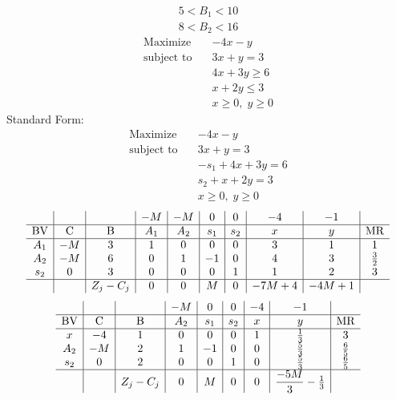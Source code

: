 \documentclass{article}
\begin{document}
\begin{align*}
5<B_{1}<10\end{align*}
\begin{align*}
8<B_{2}<16\end{align*}
\begin{align*}
\text{Maximize} \quad & -4x - y\\
\text{subject to} \quad
& 3x + y=3\\
& 4x + 3y\ge6\\
& x + 2y\le3\\
& x\ge0,\; y\ge0\end{align*}
Standard Form:\\
\begin{align*}
\text{Maximize} \quad & -4x - y\\
\text{subject to} \quad
& 3x + y=3\\
& -s_{1} + 4x + 3y=6\\
& s_{2} + x + 2y=3\\
& x\ge0,\; y\ge0\end{align*}
\begin{align*}
\begin{array}{c|c|c|c|c|c|c|c|c|c}
 &  &  & -M & -M & 0 & 0 & -4 & -1 & \\
\hline
\text{BV} & \text{C} & \text{B} & A_{1} & A_{2} & s_{1} & s_{2} & x & y & \text{MR} \\
\hline
A_{1} & -M & 3 & 1 & 0 & 0 & 0 & 3 & 1 & 1 \\
A_{2} & -M & 6 & 0 & 1 & -1 & 0 & 4 & 3 & \frac{3}{2} \\
s_{2} & 0 & 3 & 0 & 0 & 0 & 1 & 1 & 2 & 3 \\
\hline
 &  & Z_j-C_j & 0 & 0 & M & 0 & -7M + 4 & -4M + 1 & \\
\end{array}
\end{align*}
\begin{align*}
\begin{array}{c|c|c|c|c|c|c|c|c}
 &  &  & -M & 0 & 0 & -4 & -1 & \\
\hline
\text{BV} & \text{C} & \text{B} & A_{2} & s_{1} & s_{2} & x & y & \text{MR} \\
\hline
x & -4 & 1 & 0 & 0 & 0 & 1 & \frac{1}{3} & 3 \\
A_{2} & -M & 2 & 1 & -1 & 0 & 0 & \frac{5}{3} & \frac{6}{5} \\
s_{2} & 0 & 2 & 0 & 0 & 1 & 0 & \frac{5}{3} & \frac{6}{5} \\
\hline
 &  & Z_j-C_j & 0 & M & 0 & 0 & \dfrac{-5M}{3} - \frac{1}{3} & \\
\end{array}
\end{align*}
\end{document}
